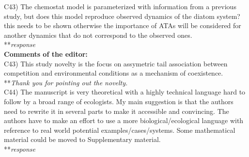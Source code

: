 \documentclass[letterpaper,11pt]{article}
\begin{document}
\noindent C43) The chemostat model is parameterized with information from a previous study, but does this model reproduce observed dynamics of the diatom system? this needs to be shown otherwise the importance of ATAs will be considered for another dynamics that do not correspond to the observed ones. \\

\noindent ***\emph{response} \\

\noindent \textbf{Comments of the editor:} \\

\noindent C43) This study novelty is the focus on assymetric tail association between competition and environmental conditions as a mechanism of coexistence. \\

\noindent ***\emph{Thank you for pointing out the novelty.} \\

\noindent C44) The manuscript is very theoretical with a highly technical language hard to follow by a broad range of ecologists. My main suggestion is that the authors need to rewrite it in several parts to make it accessible and convincing. The authors have to make an effort to use a more biological/ecological language with reference to real world potential examples/cases/systems. Some mathematical material could be moved to Supplementary material. \\

\noindent ***\emph{response} \\
\end{document}

